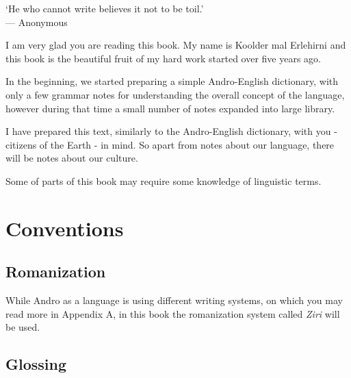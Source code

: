 \begin{center}\small
`He who cannot write believes it not to be toil.'\\
--- Anonymous\footnotemark
\end{center}\bigskip


 I am very glad you are reading this book. My name is
Koolder mal Erlehirni and this book is the beautiful fruit of my hard work
started over five years ago.

In the beginning, we started preparing a simple Andro-English dictionary, with
only a few grammar notes for understanding the overall concept of the language,
however during that time a small number of notes expanded into large library.

I have prepared this text, similarly to the Andro-English dictionary, with you -
citizens of the Earth - in mind. So apart from notes about our language, there
will be notes about our culture.

Some of parts of this book may require some knowledge of linguistic terms.

\bigskip


\section{Conventions}

\subsection{Romanization}

While Andro as a language is using different writing systems, on which you may
read more in Appendix A, in this book the romanization system called
\textit{Ziri} will be used.

\subsection{Glossing}


